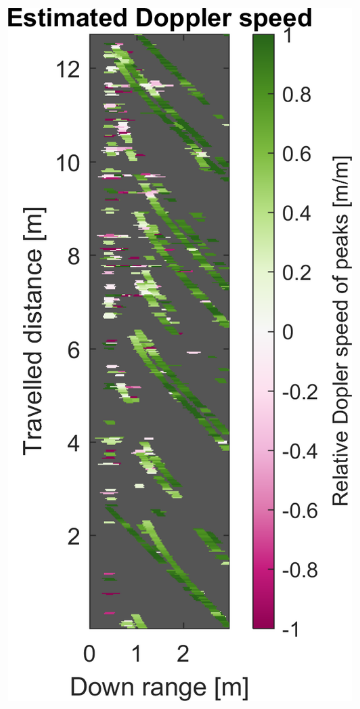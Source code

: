 \begin{figure}[htbp]
\begin{subfigure}[t]{0.475\linewidth}
    \end{subfigure}%
    \hfill%
    \begin{subfigure}[t]{0.475\linewidth}
        \centering
        \includegraphics[width=\linewidth,max height=.475\textheight]{gfx/results/queue_doppler.png}

\end{subfigure}
\end{figure}
